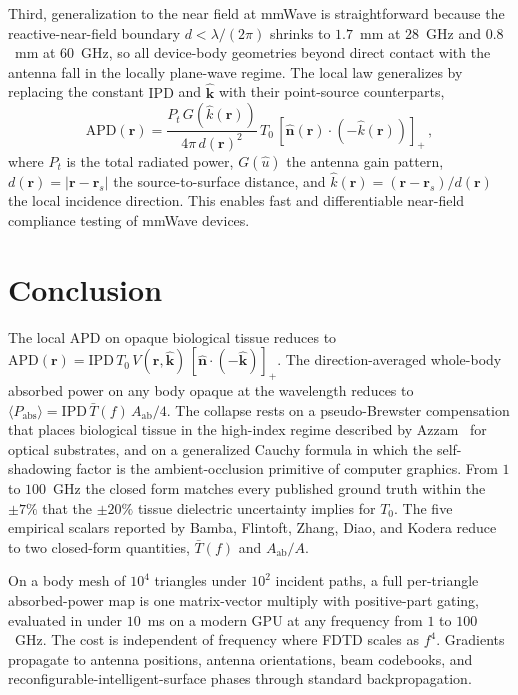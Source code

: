 \documentclass[journal,twocolumn,10pt]{IEEEtran}
\theoremstyle{plain}
\theoremstyle{remark}
\newcommand{\khat}{\hat{\bm{k}}}
\newcommand{\nhat}{\hat{\bm{n}}}
\newcommand{\rr}{\mathbf{r}}
\newcommand{\IPD}{\mathrm{IPD}}
\newcommand{\APD}{\mathrm{APD}}
\newcommand{\Aab}{A_{\mathrm{ab}}}
\newcommand{\Tbar}{\bar{T}}
\newcommand{\pospart}[1]{\left[#1\right]_{+}}
\newcommand{\Vis}{V}
\begin{document}
Third, generalization to the near field at mmWave is straightforward
because the reactive-near-field boundary $d < \lambda/(2\pi)$ shrinks
to $1.7$~mm at $28$~GHz and $0.8$~mm at $60$~GHz, so all
device-body geometries beyond direct contact with the antenna fall in
the locally plane-wave regime. The local law generalizes by replacing
the constant $\IPD$ and $\khat$ with their point-source counterparts,
\begin{equation}\label{eq:near-field}
  \APD(\rr) = \frac{P_t\,G(\hat{k}(\rr))}{4\pi\,d(\rr)^2}\,T_0\,
              \pospart{\nhat(\rr)\cdot(-\hat{k}(\rr))}\, ,
\end{equation}
where $P_t$ is the total radiated power, $G(\hat{u})$ the antenna
gain pattern, $d(\rr) = |\rr - \rr_s|$ the source-to-surface
distance, and $\hat{k}(\rr) = (\rr - \rr_s)/d(\rr)$ the local
incidence direction. This enables fast and differentiable near-field
compliance testing of mmWave devices.


\section{Conclusion}\label{sec:conc}

The local \gls{APD} on opaque biological tissue reduces to
$\APD(\rr) = \IPD\,T_0\,\Vis(\rr,\khat)\,
\pospart{\nhat\cdot(-\khat)}$. The direction-averaged whole-body
absorbed power on any body opaque at the wavelength reduces to
$\langle P_{\mathrm{abs}}\rangle = \IPD\,\Tbar(f)\,\Aab/4$. The
collapse rests on a pseudo-Brewster compensation that places
biological tissue in the high-index regime described by
Azzam~\cite{Azzam2015} for optical substrates, and on a generalized
Cauchy formula in which the self-shadowing factor is the
ambient-occlusion primitive of computer graphics. From $1$ to
$100$~GHz the closed form matches every published ground truth
within the $\pm 7\%$ that the $\pm 20\%$ tissue dielectric
uncertainty implies for $T_0$. The five empirical scalars reported
by Bamba, Flintoft, Zhang, Diao, and Kodera reduce to two
closed-form quantities, $\Tbar(f)$ and $\Aab/A$.

On a body mesh of $10^4$ triangles under $10^2$ incident paths, a
full per-triangle absorbed-power map is one matrix-vector multiply
with positive-part gating, evaluated in under $10$~ms on a modern
GPU at any frequency from $1$ to $100$~GHz. The cost is independent
of frequency where FDTD scales as $f^4$. Gradients propagate to
antenna positions, antenna orientations, beam codebooks, and
reconfigurable-intelligent-surface phases through standard
backpropagation.
\end{document}
